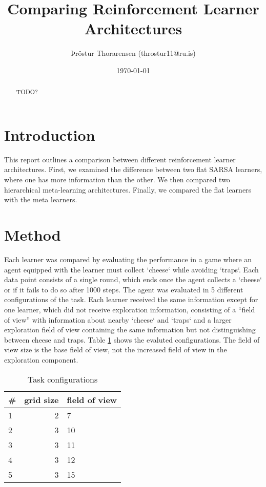 \documentclass{article}
\begin{document}

\title{Comparing Reinforcement Learner Architectures}
\author{Þröstur Thorarensen (throstur11@ru.is)}
\date{\today}
\maketitle

\begin{abstract}
	TODO?
\end{abstract}

\newpage
\tableofcontents
\newpage

	\section{Introduction}
	This report outlines a comparison between different reinforcement learner architectures. First, we examined the difference between two flat SARSA learners, where one has more information than the other. We then compared two hierarchical meta-learning architectures. Finally, we compared the flat learners with the meta learners. 


	\section{Method}
	Each learner was compared by evaluating the performance in a game where an agent equipped with the learner must collect `cheese` while avoiding `traps`. Each data point consists of a single round, which ends once the agent collects a `cheese` or if it fails to do so after 1000 steps. The agent was evaluated in 5 different configurations of the task.
	Each learner received the same information except for one learner, which did not receive exploration information, consisting of a ``field of view'' with information about nearby `cheese` and `traps` and a larger exploration field of view containing the same information but not distinguishing between cheese and traps.
	Table \ref{tbl:task-config} shows the evaluted configurations. The field of view size is the base field of view, not the increased field of view in the exploration component.
	
	\begin{table}[h]
		\centering
		\begin{tabular}{l | r | l }
			\# & grid size & field of view \\ 
			\hline
			1 & 2 & 7  \\
			2 & 3 & 10 \\
			3 & 3 & 11 \\
			4 & 3 & 12 \\
			5 & 3 & 15 \\
		 \end{tabular}
		 \caption{Task configurations}
		 \label{tbl:task-config}
	 \end{table}
\end{document}
